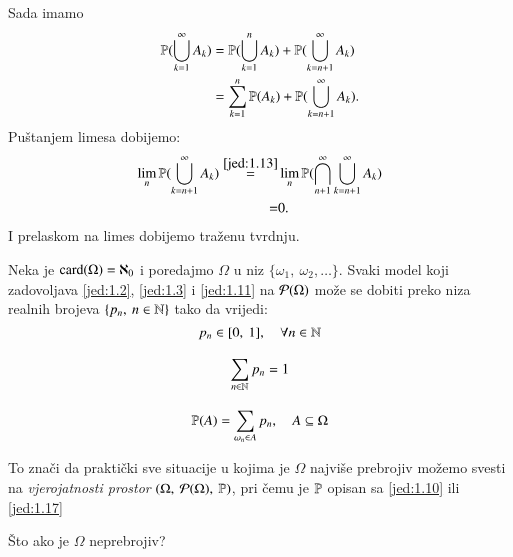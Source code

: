 \begin{rj}[\ref{zad:1.12}]
\begin{enumerate}[label=(\alph*)]
        Sada imamo
        \begin{align*}
            \mathbb{P}({\bigcup\limits_{k = 1}^{\infty} A_k})
            &= \mathbb{P}({\bigcup\limits_{k = 1}^{n} A_k})
            + \mathbb{P}({\bigcup\limits_{k = n + 1}^{\infty} A_k}) \\
            &= \sum\limits_{k = 1}^{n} \mathbb{P}({A_k})
            + \mathbb{P}({\bigcup\limits_{k = n + 1}^{\infty} A_k}). 
        \end{align*}
        Pu\v stanjem limesa dobijemo:
        \begin{align*}
            \lim_n \mathbb{P}({\bigcup\limits_{k = n + 1}^{\infty} A_k})
            \overset{\eqref{jed:1.13}}{=}& \lim_n
            \mathbb{P}({\bigcap\limits_{n + 1}^{\infty}\bigcup\limits_{k = n + 1}^{\infty} A_k})\\
            =& 0.
            \end{align*}
        I prelaskom na limes dobijemo tra\v zenu tvrdnju.
    \end{enumerate}
\end{rj}

\begin{pr} \label{pr:1.14}
    Neka je $\textnormal{card}({\Omega}) = \aleph_0$ i poredajmo $\Omega$ u niz $\{ \omega_1, \: \omega_2, \dots \}$.
    Svaki model koji zadovoljava \eqref{jed:1.2}, \eqref{jed:1.3} i \eqref{jed:1.11} na $\mathcal{P}({\Omega})$ mo\v ze se dobiti preko niza realnih brojeva $\{p_n, \: n \in \mathbb{N} \}$ tako da vrijedi:
    \begin{equation}   %
        p_n \in [0, \: 1], \quad \forall n \in \N
    \end{equation}

    \begin{equation}
        \sum\limits_{n \in \mathbb{N}}^{} p_n = 1
    \end{equation}

    \begin{equation} \label{jed:1.17}
        \mathbb{P}({A}) = \sum\limits_{\omega_n \in A}^{} p_n, \quad A
            \subseteq \Omega
    \end{equation}
\end{pr}

To zna\v ci da prakti\v cki sve situacije u kojima je $\Omega$ najvi\v se prebrojiv mo\v zemo svesti na \emph{vjerojatnosti prostor} $(\Omega, \: \mathcal{P}({\Omega}), \: \mathbb{P})$, pri \v cemu je $\mathbb{P}$ opisan sa \eqref{jed:1.10} ili \eqref{jed:1.17}

\v Sto ako je $\Omega$ neprebrojiv?

